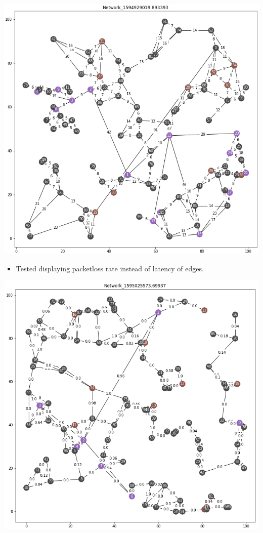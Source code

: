 \documentclass{weeklyreport}
\begin{document}
\begin{itemize}
    	{\centering \includegraphics[width=\linewidth]{week_2/NetworkColor.png}}
    
    \begin{itemize}
		\item Tested displaying packetloss rate instead of latency of edges.
	\end{itemize}
\end{itemize}

{\centering \includegraphics[width=\linewidth]{week_2/NetworkPacketloss.png}}
\end{document}
